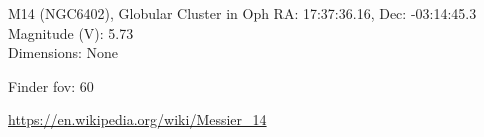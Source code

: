\begin{block}{M14 (NGC6402), Globular Cluster in Oph}
    RA: 17:37:36.16, Dec: -03:14:45.3 \\ 
    Magnitude (V): 5.73 \\ 
    Dimensions: None 

    Finder fov: 60 

    \url{https://en.wikipedia.org/wiki/Messier_14} 
\end{block}